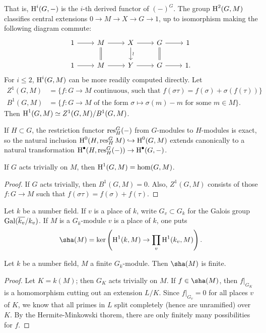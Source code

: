 That is, $\operatorname{H}^i(G,-)$ is the $i$-th derived functor of $(-)^G$. The group 
$\operatorname{H}^2(G,M)$ classifies central extensions $0\to M\to X\to G\to 1$, up to 
isomorphism making the following diagram commute:
\[\begin{tikzcd}
  1 \ar[r] 
    & M \ar[r] \ar[d, equal] 
    & X \ar[r] \ar[d, "\wr"] 
    & G \ar[r] \ar[d, equal] 
    & 1 \\
  1 \ar[r] 
    & M \ar[r] 
    & Y \ar[r] 
    & G \ar[r] 
    & 1 .
\end{tikzcd}\]
For $i\leqslant 2$, $\operatorname{H}^i(G,M)$ can be more readily computed directly. Let 
\begin{align*}
  Z^1(G,M) &= \{f:G\to M\text{ continuous, such that }f(\sigma\tau)=f(\sigma)+\sigma(f(\tau))\} \\
  B^1(G,M) &= \{f:G\to M\text{ of the form }\sigma\mapsto \sigma(m)-m\text{ for some }m\in M\} .
\end{align*}
Then $\operatorname{H}^1(G,M)\simeq Z^1(G,M)/B^1(G,M)$. 

If $H\subset G$, the restriction functor $\operatorname{res}_H^G(-)$ from $G$-modules to 
$H$-modules is exact, so the natural inclusion 
$\operatorname{H}^0(H,\operatorname{res}_H^G M)\hookrightarrow \operatorname{H}^0(G,M)$ extends canonically to a natural 
transformation $\operatorname{H}^\bullet(H,\operatorname{res}_H^G(-))\to \operatorname{H}^\bullet(G,-)$. 

\begin{theorem}
If $G$ acts trivially on $M$, then $\operatorname{H}^1(G,M)=\hom(G,M)$. 
\end{theorem}
\begin{proof}
If $G$ acts trivially, then $B^1(G,M)=0$. Also, $Z^1(G,M)$ consists of those 
$f:G\to M$ such that $f(\sigma\tau)=f(\sigma)+f(\tau)$. 
\end{proof}

Let $k$ be a number field. If $v$ is a place of $k$, write $G_v\subset G_k$ 
for the Galois group $\operatorname{Gal}(\overline{k_v}/k_v)$. If $M$ is a $G_k$-module 
$v$ is a place of $k$, one puts 
\[
  \sha(M) = \ker\left(\h^1(k,M) \to \prod_v \h^1(k_v,M)\right) .
\]

\begin{theorem}
Let $k$ be a number field, $M$ a finite $G_k$-module. Then 
$\sha(M)$ is finite. 
\end{theorem}
\begin{proof}
Let $K=k(M)$; then $G_K$ acts trivially on $M$. If $f\in \sha(M)$, then 
$f|_{G_K}$ is a homomorphism cutting out an extension $L/K$. Since 
$f|_{G_v}=0$ for all places $v$ of $K$, we know that all primes in $L$ split 
completely (hence are unramified) over $K$. By the Hermite-Minkowski thorem, 
there are only finitely many possibilities for $f$. 
\end{proof}

